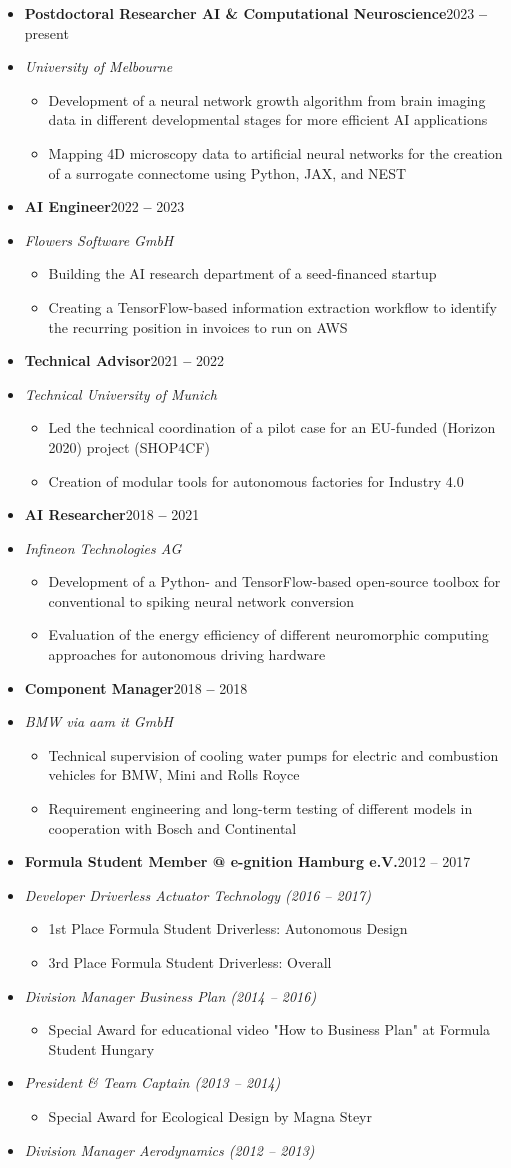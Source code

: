 \documentclass[a4paper,11pt]{article}
\newcommand{\entryBf}[2]{\item \textbf{#1}\hfill #2\vspace{-9pt}}
\newcommand{\entryIt}[1]{\item \textit{\small #1}\vspace{-7pt}}
\newcommand{\cvItemizeBegin}{\begin{itemize}[rightmargin=75pt]}
\newcommand{\cvItemizeEnd}{\end{itemize} \vspace{-7pt}}
\newcommand{\cvItem}[1]{\item[--] \small #1\vspace{-2pt}}
\begin{document}
\begin{itemize}
    \entryBf{Postdoctoral Researcher AI \& Computational Neuroscience}{2023 \textbf{--} present}
    \entryIt{University of Melbourne}
    \cvItemizeBegin
        \cvItem{Development of a neural network growth algorithm from brain imaging data in different developmental stages for more efficient AI applications}
        \cvItem{Mapping 4D microscopy data to artificial neural networks for the creation of a surrogate connectome using Python, JAX, and NEST}
    \cvItemizeEnd
    
    \entryBf{AI Engineer}{2022 \textbf{--} 2023}
    \entryIt{Flowers Software GmbH}
    \cvItemizeBegin
        \cvItem{Building the AI research department of a seed-financed startup}
        \cvItem{Creating a TensorFlow-based information extraction workflow to identify the recurring position in invoices to run on AWS}
    \cvItemizeEnd

    \entryBf{Technical Advisor}{2021 \textbf{--} 2022}
    \entryIt{Technical University of Munich}
    \cvItemizeBegin
        \cvItem{Led the technical coordination of a pilot case for an EU-funded (Horizon 2020) project (SHOP4CF)}
        \cvItem{Creation of modular tools for autonomous factories for Industry 4.0}
    \cvItemizeEnd

    \entryBf{AI Researcher}{2018 \textbf{--} 2021}
    \entryIt{Infineon Technologies AG}
    \cvItemizeBegin
        \cvItem{Development of a Python- and TensorFlow-based open-source toolbox for conventional to spiking neural network conversion}
        \cvItem{Evaluation of the energy efficiency of different neuromorphic computing approaches for autonomous driving hardware}
    \cvItemizeEnd
    
    \entryBf{Component Manager}{2018 \textbf{--} 2018}
    \entryIt{BMW via aam it GmbH}
    \cvItemizeBegin
        \cvItem{Technical supervision of cooling water pumps for electric and combustion vehicles for BMW, Mini and Rolls Royce}
        \cvItem{Requirement engineering and long-term testing of different models in cooperation with Bosch and Continental}
    \cvItemizeEnd
    
    \entryBf{Formula Student Member @ e-gnition Hamburg e.V.}{2012 {--} 2017}
    \entryIt{Developer Driverless Actuator Technology (2016 -- 2017)}
    \cvItemizeBegin
        \cvItem{1st Place Formula Student Driverless: Autonomous Design}
        \cvItem{3rd Place Formula Student Driverless: Overall}
    \cvItemizeEnd
    \vspace{-4pt}
    \entryIt{Division Manager Business Plan (2014 -- 2016)}
    \cvItemizeBegin
        \cvItem{Special Award for educational video "How to Business Plan" at Formula Student Hungary}
    \cvItemizeEnd
    \vspace{-4pt}
    \entryIt{President \& Team Captain (2013 -- 2014)}
    \cvItemizeBegin
        \cvItem{Special Award for Ecological Design by Magna Steyr}
    \cvItemizeEnd
    \vspace{-4pt}
    \entryIt{Division Manager Aerodynamics (2012 -- 2013)}
    \vspace{2pt}
    

\end{itemize}
\end{document}
